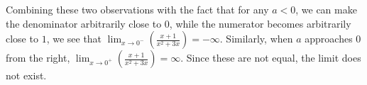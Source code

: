 \documentclass{ximera}
\begin{document}
\begin{exercise}
\begin{hint}
     Combining these two observations with the fact that for any $a<0$, we can make the denominator arbitrarily close to $0$, while the numerator becomes arbitrarily close to $1$, we see that $\lim_{x\to0^{-}}\left({\frac{x+1}{x^2+3x}}\right)=-\infty$. Similarly, when $a$ approaches $0$ from the right, $\lim_{x\to0^{+}}\left({\frac{x+1}{x^2+3x}}\right)=\infty$. Since these are not equal, the limit does not exist.
     \end{hint}
\end{exercise}
\end{document}
